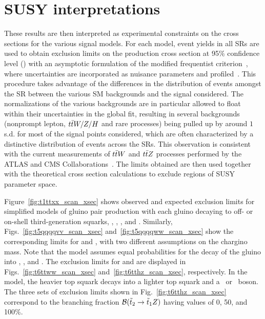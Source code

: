 \section{SUSY interpretations}
\label{sec:ssinterpretations}

These results are then interpreted as experimental constraints on the cross sections for
the various signal models. For each model,
event yields in all SRs are used to obtain exclusion limits
on the production cross section at 95\% confidence level (\CL) with
an asymptotic formulation of the modified frequentist \CLs
criterion~\cite{STAT:Junk1999kv,STAT:Read2002hq,STAT:ATLPHYSPUB2011011,STAT:Cowan2010js},
where uncertainties are incorporated as nuisance parameters and profiled~\cite{STAT:ATLPHYSPUB2011011}.
This procedure takes advantage of the differences in the distribution of events amongst the SR between the various SM backgrounds and the signal considered.
The normalizations of the various backgrounds are in particular allowed to float within their uncertainties in the global fit, resulting in several backgrounds (nonprompt lepton, $t\bar{t} W/Z/H$ and rare processes) being pulled up by around $1$ s.d. for most of the signal points considered, which are often characterized by a distinctive distribution of events across the SRs. 
This observation is consistent with the current measurements of $t\bar{t} W$ and $t\bar{t} Z$ processes performed by the ATLAS and CMS Collaborations~\cite{ATLAS:ttV,CMS:ttV}.
The limits obtained are then used together with the theoretical cross section
calculations to exclude regions of SUSY parameter space.


Figure~\ref{fig:t1ttxx_scan_xsec} shows observed and expected exclusion limits
for simplified models of gluino pair production with each gluino decaying
to off- or on-shell third-generation squarks,
\Totttt, \TfttbbWW, \Tftttt, and \Tfttcc.
Similarly, Figs.~\ref{fig:t5qqqqvv_scan_xsec} and~\ref{fig:t5qqqqww_scan_xsec} show the corresponding limits for \TfqqqqWZ and \TfqqqqWW, with
two different assumptions on the chargino mass.
Note that the \TfqqqqWZ model assumes equal probabilities for
the decay of the gluino into \chiplus, \chiminus, and \neutralinotwo.
The exclusion limits for \TsttWW and \TsttHZ are displayed in
Figs.~\ref{fig:t6ttww_scan_xsec} and~\ref{fig:t6tthz_scan_xsec},
respectively.
In the \TsttHZ model, the heavier top squark decays
into a lighter top squark and a \PZ\ or \PH\ boson. The three
sets of exclusion limits shown in Fig.~\ref{fig:t6tthz_scan_xsec}
correspond to the branching fraction $\mathcal{B}(\tilde{t}_2\to\tilde{t}_1Z)$ having values of
0, 50, and 100\%.

